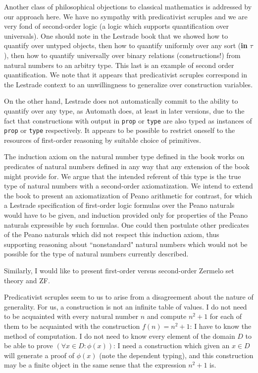 \documentclass[12pt]{article}
\begin{document}
Another class of philosophical objections to classical mathematics is addressed by our approach here.   We have no sympathy with predicativist scruples and we are very fond of second-order logic (a logic which supports quantification over universals).   One should note in the Lestrade book that we showed how to quantify over untyped objects, then how to quantify uniformly over any sort ({\bf in} $\tau$), then how to quantify universally over binary relations (constructions!) from natural numbers to an arbitry type.  This last is an example of second order quantification.  We note that it appears that predicativist scruples correspond in the Lestrade context to an unwillingness to generalize over construction variables.

On the other hand, Lestrade does not automatically commit to the ability to quantify over any type, as Automath does, at least in later versions, due to the fact that constructions with output in {\tt prop} or {\tt type} are also typed as instances of {\tt prop} or {\tt type} respectively.  It appears to be possible to restrict oneself to the resources of first-order reasoning by suitable choice of primitives.

The induction axiom on the natural number type defined in the book works on predicates of natural numbers defined in any way that any extension of the book might provide for.
We argue that the intended referent of this type is the true type of natural numbers with a second-order axiomatization.  We intend to extend the book to present an axiomatization of Peano arithmetic for contrast, for which a Lestrade specification of first-order logic formulas over the Peano naturals would have to be given, and induction provided only for properties of the Peano naturals expressible by such formulas.  One could then postulate other predicates of the Peano naturals which did not respect this induction axiom, thus supporting reasoning about ``nonstandard" natural numbers which would not be possible for the type of natural numbers currently described.

Similarly, I would like to present first-order versus second-order Zermelo set theory and ZF.

Predicativist scruples seem to us to arise from a disagreement about the nature of generality.  For us, a construction is not an infinite table of values.  I do not need to be acquainted with
every natural number $n$ and compute $n^2+1$ for each of them to be acquainted with the construction $f(n) = n^2+1$:  I have to know the method of computation.  I do not need
to know every element of the domain $D$ to be able to prove $(\forall x \in D:\phi(x))$:  I need a construction which given an $x \in D$ will generate a proof of $\phi(x)$ (note the dependent typing), and this construction may be a finite object in the same sense that the expression $n^2+1$ is.
\end{document}
